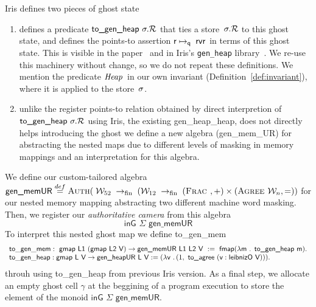 \begin{assumption}
\label{assumption}
Iris defines two pieces of ghost state
\begin{enumerate}
\item  defines a predicate $\textsf{to\_gen\_heap }\sigma.\mathcal{R}$
  that ties a store~$\sigma.\mathcal{R}$ to this ghost state,
  and defines the points-to assertion $\mathsf{r}\mapsto_{\mathsf{q}}\;\mathsf{rv}\mathsf{r}$
  in terms of this ghost state.
  This is visible in the paper~\cite[\S6.3.2]{iris}
  and in Iris's \texttt{gen\_heap} library~\cite{genheap}.
  We re-use this machinery without change,
  so we do not repeat these definitions.
  We mention the predicate $\mathit{Heap}\;\!$
  in our own invariant (Definition~\ref{def:invariant}),
  where it is applied to the \logical store~$\sigma$.
\item unlike the register points-to relation obtained by direct interpretion of $\textsf{to\_gen\_heap }\sigma.\mathcal{R}$ using Iris, the existing \textsf{gen\_heap\_heap},
  does not directly helps introducing the ghost we define a new algebra (\textsf{gen\_mem\_UR}) for abstracting the nested maps due to different levels of masking in memory mappings and an interpretation for this algebra. 
\end{enumerate}
\end{assumption}

\begin{definition}
We define our custom-tailored algebra 
\newcommand\fpfn{\rightarrow_{\textrm{fin}}}
\( \textsf{gen\_memUR} \stackrel{def}{=}
  \authm(\;
  \Locft \;\fpfn\;
  (\Loctw \;\fpfn\;  (\textsc{Frac }, \mathord{+}) \times (\textsc{Agree } \Loc,\mathord{=}) )
  \)
  for our nested memory mapping abstracting two different machine word masking. Then, we register our \emph{authoritative camera} \cite[\S6.3.3]{iris} from this algebra
  \[\textsf{inG } \Sigma \textsf{ gen\_memUR} \]
  To interpret this nested ghost map we define \textsf{to\_gen\_mem}
  \[
  \begin{array}{l}
    \mathsf{to\_gen\_mem} : \textsf{ gmap L1 }(\textsf{gmap L2 V})\rightarrow \textsf{gen\_memUR L1 L2 V } := \textsf{ fmap} (\lambda \textsf{m . to\_gen\_heap m}). \\
     \mathsf{to\_gen\_heap } : \textsf{gmap L V} \rightarrow \textsf{gen\_heapUR L V} :=  (\lambda \textsf{v }\ldotp (1, \textsf{ to\_agree } (\textsf{v} : \textsf{leibnizO V}))).
  \end{array}
  \]
 throuh using \textsf{to\_gen\_heap} from previous Iris version. 
As a final step, we allocate an empty ghost cell $\gamma$ at the beggining of a program execution to store the element of the monoid $\textsf{inG } \Sigma \textsf{ gen\_memUR}$.
\end{definition}

